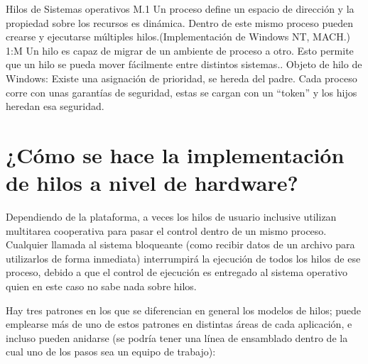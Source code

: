 \documentclass[11pt]{article}
\begin{document}
Hilos de Sistemas operativos
M.1	Un proceso define un espacio de dirección y la propiedad sobre los recursos es dinámica. Dentro de este mismo proceso pueden crearse y ejecutarse múltiples hilos.(Implementación de Windows NT, MACH.)
1:M	Un hilo es capaz de migrar de un ambiente de proceso a otro. Esto permite que un hilo se pueda mover fácilmente entre distintos  sistemas..
Objeto de hilo de Windows: Existe una asignación de prioridad, se hereda del padre.
Cada proceso corre con unas garantías de seguridad, estas se cargan con un “token” y los hijos heredan esa seguridad.

\section{¿Cómo se hace la implementación de hilos a nivel de hardware?}

Dependiendo de la plataforma, a veces los hilos de usuario inclusive utilizan multitarea cooperativa para pasar el control dentro de un mismo proceso. Cualquier llamada al sistema bloqueante (como recibir datos de un archivo para utilizarlos de forma inmediata) interrumpirá la ejecución de todos los hilos de ese proceso, debido a que el control de ejecución es entregado al sistema operativo quien en este caso no sabe nada sobre hilos.

Hay tres patrones en los que se diferencian en general los modelos de hilos; puede emplearse más de uno de estos patrones en distintas áreas de cada aplicación, e incluso pueden anidarse (se podría tener una línea de ensamblado dentro de la cual uno de los pasos sea un equipo de trabajo):
\end{document}
